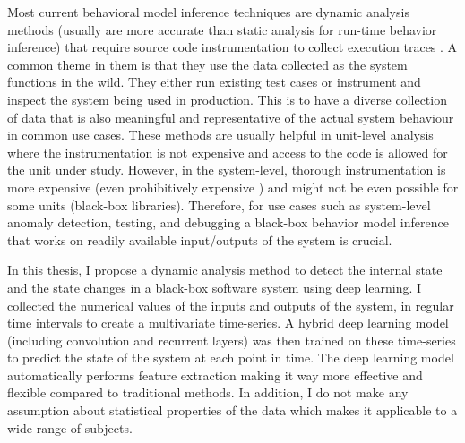 Most current behavioral model inference techniques are dynamic analysis methods (usually are more accurate than static analysis for run-time behavior inference) that require source code instrumentation to collect execution traces \cite{lo2011mining}. A common theme in them is that they use the data collected as the system functions in the wild. They either run existing test cases or instrument and inspect the system being used in production. 
This is to have a diverse collection of data that is also meaningful and representative of the actual system behaviour in common use cases. 
These methods are usually helpful in unit-level analysis where the instrumentation is not expensive and access to the code is allowed for the unit under study. However, in the system-level, thorough instrumentation is more expensive (even prohibitively expensive \cite{mashhadi2019empirical}) and might not be even possible for some units (black-box libraries). Therefore, for use cases such as system-level anomaly detection, testing, and debugging a black-box behavior model inference that works on readily available input/outputs of the system is crucial. 


In this thesis, I propose a dynamic analysis method to detect the internal state and the state changes in a black-box software system using deep learning. I collected the numerical values of the inputs and outputs of the system, in regular time intervals to create a multivariate time-series. A hybrid deep learning model (including convolution and recurrent layers) was then trained on these time-series to predict the state of the system at each point in time. The deep learning model automatically performs feature extraction making it way more effective and flexible compared to traditional methods. In addition, I do not make any assumption about statistical properties of the data which makes it applicable to a wide range of subjects.   


